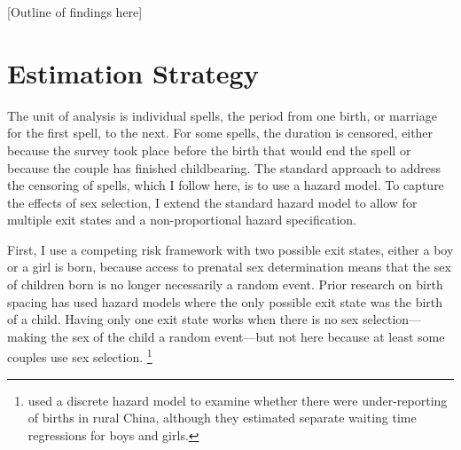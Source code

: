 \documentclass[12pt,letterpaper]{article}
\begin{document}
[Outline of findings here]


% 
% 
% 





\section{Estimation Strategy\label{sec:strategy}}


The unit of analysis is individual spells, the period from one birth, or marriage for
the first spell, to the next.
For some spells, the duration is censored, either because the survey
took place before the birth that would end the spell or because the couple
has finished childbearing.
The standard approach to address the censoring of spells, which I follow here, is 
to use a hazard model.
To capture the effects of sex selection, I extend the standard hazard model 
to allow for multiple exit states and a non-proportional hazard specification.

First, I use a competing risk framework with two possible exit states, either a boy
or a girl is born, because access to prenatal sex determination means that
the sex of children born is no longer necessarily a random event.
Prior research on birth spacing has used hazard models where the only 
possible exit state was the birth of a child. 
Having only one exit state works when there is no sex selection---making the 
sex of the child a random event---but not here because at least some couples use 
sex selection.%
\footnote{
\cite{Merli2000} used a discrete hazard model to examine whether 
there were under-reporting of births in rural China, although they 
estimated separate waiting time regressions for boys and girls.
}
\end{document}
